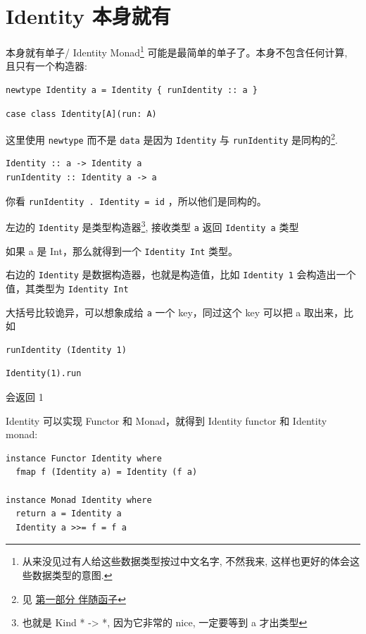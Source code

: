 \documentclass[11pt]{tufte-book}
\begin{document}
\chapter{Identity 本身就有}
\label{sec:orgf411766}

本身就有单子/ Identity Monad\footnote{从来没见过有人给这些数据类型按过中文名字, 不然我来, 这样也更好的体会这些数据类型的意图.} 可能是最简单的单子了。本身不包含任何计算, 且只有一个构造器:
\begin{verbatim}
newtype Identity a = Identity { runIdentity :: a }
\end{verbatim}

\begin{verbatim}
case class Identity[A](run: A)
\end{verbatim}

这里使用 \texttt{newtype} 而不是 \texttt{data} 是因为 \texttt{Identity} 与 \texttt{runIdentity} 是同构的\footnote{见 \href{part1.org}{第一部分 伴随函子}}.

\begin{verbatim}
Identity :: a -> Identity a
runIdentity :: Identity a -> a
\end{verbatim}

你看 \texttt{runIdentity . Identity = id} ，所以他们是同构的。

左边的 \texttt{Identity} 是类型构造器\footnote{也就是 Kind * -> *, 因为它非常的 nice, 一定要等到 a 才出类型}, 接收类型 \texttt{a} 返回 \texttt{Identity a} 类型

如果 a 是 Int，那么就得到一个 \texttt{Identity Int} 类型。

右边的 \texttt{Identity} 是数据构造器，也就是构造值，比如 \texttt{Identity 1} 会构造出一个值，其类型为 \texttt{Identity Int}

大括号比较诡异，可以想象成给 \texttt{a} 一个 key，同过这个 key 可以把 a 取出来，比如
\begin{verbatim}
runIdentity (Identity 1)
\end{verbatim}

\begin{verbatim}
Identity(1).run
\end{verbatim}

会返回 1

Identity 可以实现 Functor 和 Monad，就得到 Identity functor 和 Identity monad:

\begin{verbatim}
instance Functor Identity where
  fmap f (Identity a) = Identity (f a)

instance Monad Identity where
  return a = Identity a
  Identity a >>= f = f a
\end{verbatim}
\end{document}
